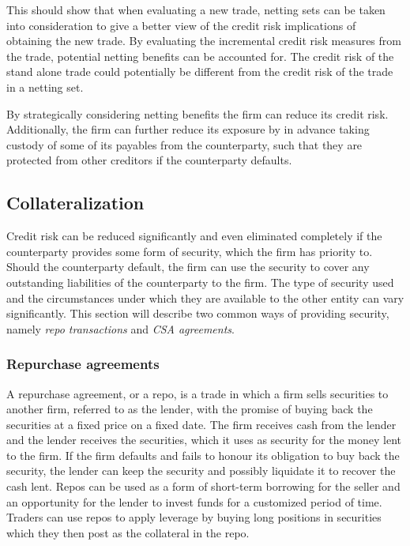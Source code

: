 \documentclass[main.tex]{subfiles}
\begin{document}
        This should show that when evaluating a new trade,
        netting sets can be taken into consideration to give a better view 
        of the credit risk implications of obtaining the new trade.
        By evaluating the incremental credit risk measures from the trade,
        potential netting benefits can be accounted for. 
        The credit risk of the stand alone trade could potentially 
        be different from the credit risk of the trade in a netting set.

        By strategically considering netting benefits the firm can reduce its credit risk. 
        Additionally, the firm can further reduce its exposure by in advance
        taking custody of some of its payables from the counterparty,
        such that they are protected from other creditors if the counterparty defaults.

    \subsection{Collateralization}
        Credit risk can be reduced significantly and even eliminated completely
        if the counterparty provides some form of security, which the firm has priority to.
        Should the counterparty default, the firm can use the security to cover any
        outstanding liabilities of the counterparty to the firm. 
        The type of security used and the circumstances 
        under which they are available to the other entity can vary significantly.
        This section will describe two common ways of providing security, 
        namely \textit{repo transactions} and \textit{CSA agreements}.

        \subsubsection{Repurchase agreements}
        A repurchase agreement, or a repo, is a trade in which a firm sells securities to another firm, 
        referred to as the lender, 
        with the promise of buying back the securities at a fixed price on a fixed date.
        The firm receives cash from the lender and the lender receives the securities,
        which it uses as security for the money lent to the firm. 
        If the firm defaults and fails to honour its obligation to buy back the security,
        the lender can keep the security and possibly liquidate it to recover the cash lent. 
        Repos can be used as a form of short-term borrowing for the seller
        and an opportunity for the lender to invest funds for a customized period of time. 
        Traders can use repos to apply leverage by buying long positions in securities 
        which they then post as the collateral in the repo. 
\end{document}
